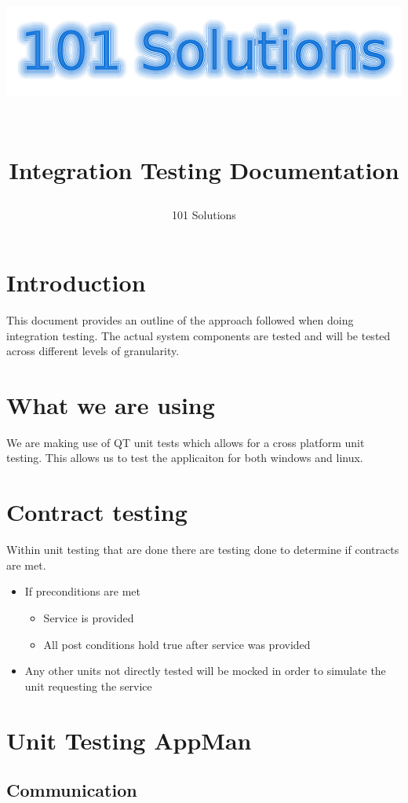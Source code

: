 \documentclass[a4paper,12pt,final]{article}
\title{
\begin{center}
  	\includegraphics[scale=0.3]{101Logo.png} 
  \end{center}
  \textbf{\\}
Integration Testing Documentation\\
}
\author{101 Solutions}
\begin{document}
\maketitle
\thispagestyle{empty}
\newpage
\tableofcontents
\thispagestyle{empty}
\newpage
{}

\section{Introduction}
This document provides an outline of the approach followed when doing integration testing. The actual system components are tested and will be tested across different levels of granularity.

\section{What we are using}
We are making use of QT unit tests which allows for a cross platform unit testing. This allows us to test the applicaiton for both windows and linux.






\section{Contract testing}
Within unit testing that are done there are testing done to determine if contracts are met. 
\begin{itemize}
\item If preconditions are met
\begin{itemize}
\item Service is provided
\item All post conditions hold true after service was provided
\end{itemize}
\item Any other units not directly tested will be mocked in order to simulate the unit requesting the service
\end{itemize}





\section{Unit Testing AppMan}
\subsection{Communication}
\end{document}
